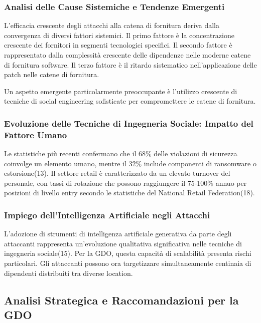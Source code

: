 \documentclass[12pt,a4paper,oneside]{book}
\begin{document}
\subsubsection{Analisi delle Cause Sistemiche e Tendenze Emergenti}

L'efficacia crescente degli attacchi alla catena di fornitura deriva dalla convergenza di diversi fattori sistemici. Il primo fattore è la concentrazione crescente dei fornitori in segmenti tecnologici specifici. Il secondo fattore è rappresentato dalla complessità crescente delle dipendenze nelle moderne catene di fornitura software. Il terzo fattore è il ritardo sistematico nell'applicazione delle patch nelle catene di fornitura.

Un aspetto emergente particolarmente preoccupante è l'utilizzo crescente di tecniche di social engineering sofisticate per compromettere le catene di fornitura.

\subsubsection{Evoluzione delle Tecniche di Ingegneria Sociale: Impatto del Fattore Umano}

Le statistiche più recenti confermano che il 68\% delle violazioni di sicurezza coinvolge un elemento umano, mentre il 32\% include componenti di ransomware o estorsione(13). Il settore retail è caratterizzato da un elevato turnover del personale, con tassi di rotazione che possono raggiungere il 75-100\% annuo per posizioni di livello entry secondo le statistiche del National Retail Federation(18).

\subsubsection{Impiego dell'Intelligenza Artificiale negli Attacchi}

L'adozione di strumenti di intelligenza artificiale generativa da parte degli attaccanti rappresenta un'evoluzione qualitativa significativa nelle tecniche di ingegneria sociale(15). Per la GDO, questa capacità di scalabilità presenta rischi particolari. Gli attaccanti possono ora targetizzare simultaneamente centinaia di dipendenti distribuiti tra diverse location.

\subsection{Analisi Strategica e Raccomandazioni per la GDO}
\end{document}
